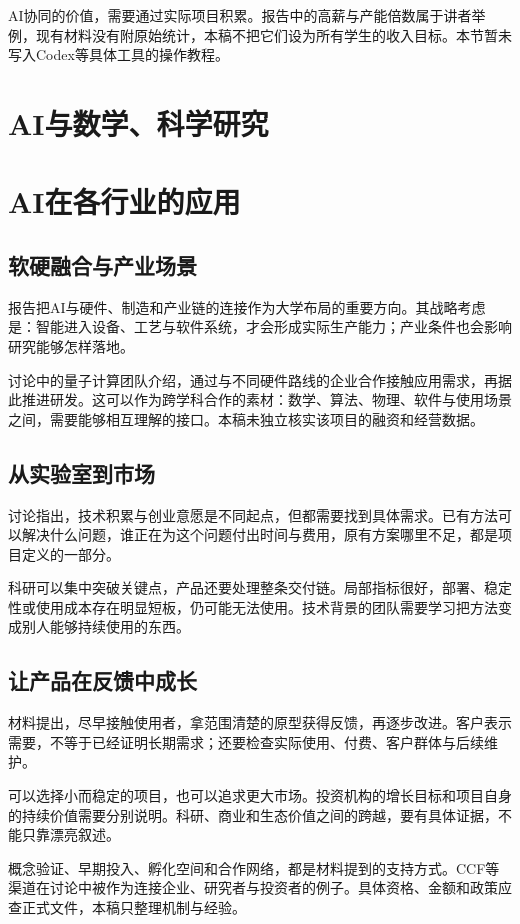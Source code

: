 \documentclass[UTF8,zihao=-4,fontset=fandol,oneside,openany]{ctexbook}
\begin{document}
AI协同的价值，需要通过实际项目积累。报告中的高薪与产能倍数属于讲者举例，现有材料没有附原始统计，本稿不把它们设为所有学生的收入目标。本节暂未写入Codex等具体工具的操作教程。

\section{AI与数学、科学研究}

\section{AI在各行业的应用}
\subsection*{软硬融合与产业场景}
报告把AI与硬件、制造和产业链的连接作为大学布局的重要方向。其战略考虑是：智能进入设备、工艺与软件系统，才会形成实际生产能力；产业条件也会影响研究能够怎样落地\cite{xiong}。

讨论中的量子计算团队介绍，通过与不同硬件路线的企业合作接触应用需求，再据此推进研发。这可以作为跨学科合作的素材：数学、算法、物理、软件与使用场景之间，需要能够相互理解的接口\cite{discussion}。本稿未独立核实该项目的融资和经营数据。

\subsection*{从实验室到市场}
讨论指出，技术积累与创业意愿是不同起点，但都需要找到具体需求。已有方法可以解决什么问题，谁正在为这个问题付出时间与费用，原有方案哪里不足，都是项目定义的一部分。

科研可以集中突破关键点，产品还要处理整条交付链。局部指标很好，部署、稳定性或使用成本存在明显短板，仍可能无法使用。技术背景的团队需要学习把方法变成别人能够持续使用的东西。

\subsection*{让产品在反馈中成长}
材料提出，尽早接触使用者，拿范围清楚的原型获得反馈，再逐步改进。客户表示需要，不等于已经证明长期需求；还要检查实际使用、付费、客户群体与后续维护。

可以选择小而稳定的项目，也可以追求更大市场。投资机构的增长目标和项目自身的持续价值需要分别说明。科研、商业和生态价值之间的跨越，要有具体证据，不能只靠漂亮叙述。

概念验证、早期投入、孵化空间和合作网络，都是材料提到的支持方式。CCF等渠道在讨论中被作为连接企业、研究者与投资者的例子。具体资格、金额和政策应查正式文件，本稿只整理机制与经验。
\end{document}
